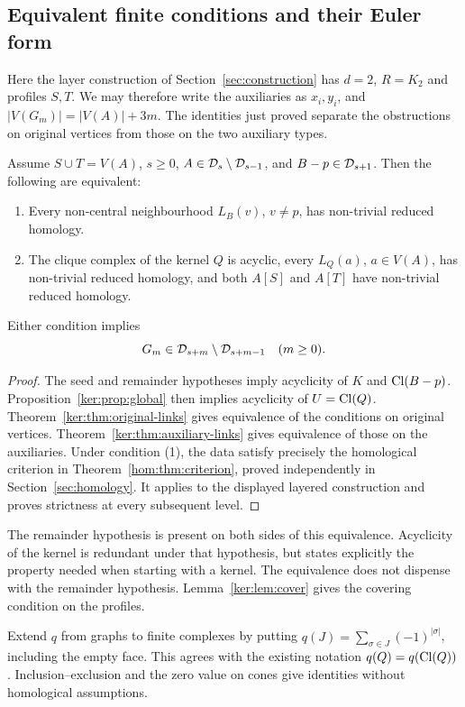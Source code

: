 \subsection{Equivalent finite conditions and their Euler form}

Here the layer construction of Section~\ref{sec:construction} has
$d=2$, $R=K_2$ and profiles $S,T$. We may therefore write the auxiliaries
as $x_i,y_i$, and $|V(G_m)|=|V(A)|+3m$. The identities just proved separate
the obstructions on original vertices from those on the two auxiliary types.

\begin{theorem}\label{ker:thm:equivalence}
Assume \(S\cup T=V(A)\), \(s\geq0\),
\(A\in\mathcal D_s\setminus\mathcal D_{s-1}\), and \(B-p\in\mathcal D_{s+1}\).
Then the following are equivalent:
\begin{enumerate}
\item Every non-central neighbourhood \(L_B(v)\), \(v\ne p\),
has non-trivial reduced homology.
\item The clique complex of the kernel \(Q\) is acyclic, every \(L_Q(a)\),
\(a\in V(A)\), has non-trivial reduced homology, and both
\(A[S]\) and \(A[T]\) have non-trivial reduced homology.
\end{enumerate}
Either condition implies
\[
 G_m\in\mathcal D_{s+m}\setminus\mathcal D_{s+m-1}\quad(m\geq0).
\]
\end{theorem}
\begin{proof}
The seed and remainder hypotheses imply acyclicity of \(K\) and
\(\operatorname{Cl}(B-p)\). Proposition~\ref{ker:prop:global} then implies
acyclicity of \(U=\operatorname{Cl}(Q)\).
Theorem~\ref{ker:thm:original-links} gives equivalence of the
conditions on original vertices. Theorem~\ref{ker:thm:auxiliary-links}
gives equivalence of those on the auxiliaries.
Under condition (1), the data satisfy precisely the homological
criterion in Theorem~\ref{hom:thm:criterion}, proved independently in
Section~\ref{sec:homology}. It applies to
the displayed layered construction and proves strictness at
every subsequent level.
\end{proof}

The remainder hypothesis is present on both sides of this
equivalence. Acyclicity of the kernel is redundant under that
hypothesis, but states explicitly the property needed when
starting with a kernel. The equivalence does not dispense with the
remainder hypothesis.
Lemma~\ref{ker:lem:cover} gives the covering condition on the profiles.

Extend \(q\) from graphs to finite complexes by putting
\(q(J)=\sum_{\sigma\in J}(-1)^{|\sigma|}\), including the empty
face. This agrees with the existing notation \(q(Q)=q(\operatorname{Cl}(Q))\).
Inclusion--exclusion and the zero value on cones give identities
without homological assumptions.

